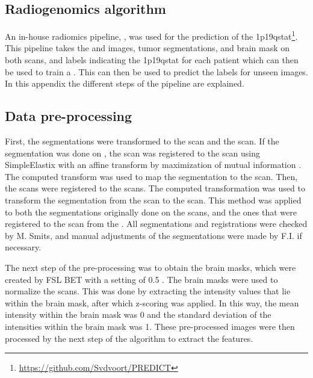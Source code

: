 \clearpage
\begin{subappendices}
\section{Radiogenomics algorithm}\label{app:LGG_1p19q_algorithm}
An in-house radiomics pipeline, , was used for the prediction of the \acl{1p19qstat}\footnote{\url{https://github.com/Svdvoort/PREDICT}}.
This pipeline takes the  and   images, \gls{tumor} segmentations, and brain mask on both scans, and labels indicating the \acl{1p19qstat} for each patient which can then be used to train a  \autocite{cortes1995support}.
This  can then be used to predict the labels for unseen images. In this appendix the different steps of the pipeline are explained.

\subsection{Data pre-processing}
First, the segmentations were transformed to the  scan and the  scan.
If the segmentation was done on , the  scan was registered to the  scan using SimpleElastix with an affine transform by maximization of mutual information \autocite{marstal2016simpleelastix}.
The computed transform was used to map the  segmentation to the  scan.
Then, the  scans were registered to the  scans.
The computed transformation was used to transform the segmentation from the  scan to the  scan.
This method was applied to both the segmentations originally done on the  scans, and the ones that were registered to the  scan from the .
All segmentations and registrations were checked by M. Smits, and manual adjustments of the segmentations were made by F.I. if necessary.

The next step of the pre-processing was to obtain the brain masks, which were created by FSL BET with a setting of 0.5 \autocite{smith2002fast}.
The brain masks were used to normalize the scans.
This was done by extracting the intensity values that lie within the brain mask, after which z-scoring was applied.
In this way, the mean intensity within the brain mask was 0 and the standard deviation of the intensities within the brain mask was 1.
These pre-processed images were then processed by the next step of the algorithm to extract the features.


\end{subappendices}
